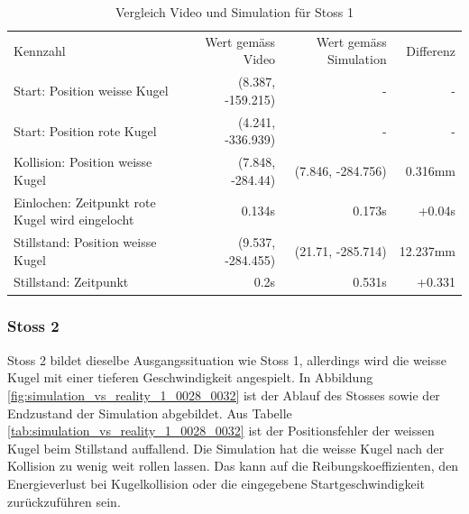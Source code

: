 \begin{table}[ht]
    \begin{tabular}{ lrrr }
        \rowcolor{\seccolor!50}
        Kennzahl & Wert gemäss Video & Wert gemäss Simulation & Differenz \\
        Start: Position weisse Kugel & (8.387, -159.215) & - & -\\
        Start: Position rote Kugel & (4.241, -336.939) & - & -\\
        Kollision: Position weisse Kugel & (7.848, -284.44) & (7.846, -284.756) & 0.316mm\\
        Einlochen: Zeitpunkt rote Kugel wird eingelocht & 0.134s & 0.173s & +0.04s\\
        Stillstand: Position weisse Kugel & (9.537, -284.455) & (21.71, -285.714) & 12.237mm\\
        Stillstand: Zeitpunkt & 0.2s & 0.531s & +0.331\\
    \end{tabular}
    \caption{Vergleich Video und Simulation für Stoss 1}
    \label{tab:simulation_vs_reality_1_0008_0011}
\end{table}

\subsubsection{Stoss 2}
Stoss 2 bildet dieselbe Ausgangssituation wie Stoss 1, allerdings wird die weisse Kugel mit einer tieferen Geschwindigkeit angespielt.
In Abbildung \ref{fig:simulation_vs_reality_1_0028_0032} ist der Ablauf des Stosses sowie der Endzustand der Simulation abgebildet.
Aus Tabelle \ref{tab:simulation_vs_reality_1_0028_0032} ist der Positionsfehler der weissen Kugel beim Stillstand auffallend.
Die Simulation hat die weisse Kugel nach der Kollision zu wenig weit rollen lassen.
Das kann auf die Reibungskoeffizienten, den Energieverlust bei Kugelkollision oder die eingegebene Startgeschwindigkeit zurückzuführen sein.


